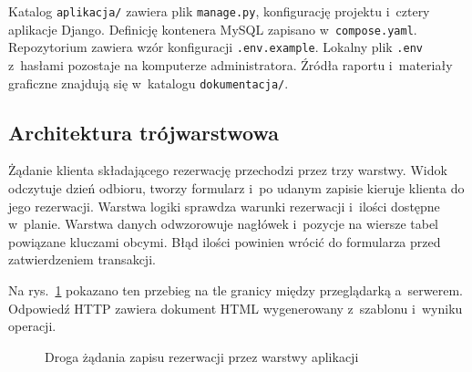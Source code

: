 \documentclass[12pt,a4paper,oneside]{article}
\newcounter{pu}
\begin{document}
Katalog \texttt{aplikacja/} zawiera plik \texttt{manage.py}, konfigurację projektu i~cztery aplikacje Django. Definicję kontenera MySQL zapisano w~\texttt{compose.yaml}. Repozytorium zawiera wzór konfiguracji \texttt{.env.example}. Lokalny plik \texttt{.env} z~hasłami pozostaje na komputerze administratora. Źródła raportu i~materiały graficzne znajdują się w~katalogu \texttt{dokumentacja/}.


\subsection{Architektura trójwarstwowa}
\label{sec:architektura}

Żądanie klienta składającego rezerwację przechodzi przez trzy warstwy. Widok odczytuje dzień odbioru, tworzy formularz i~po udanym zapisie kieruje klienta do jego rezerwacji. Warstwa logiki sprawdza warunki rezerwacji i~ilości dostępne w~planie. Warstwa danych odwzorowuje nagłówek i~pozycje na wiersze tabel powiązane kluczami obcymi. Błąd ilości powinien wrócić do formularza przed zatwierdzeniem transakcji.


Na rys.~\ref{rys:architektura} pokazano ten przebieg na tle granicy między przeglądarką a~serwerem. Odpowiedź HTTP zawiera dokument HTML wygenerowany z~szablonu i~wyniku operacji.
\begin{figure}[H]\centering
{}
\caption{Droga żądania zapisu rezerwacji przez warstwy aplikacji}\label{rys:architektura}
\end{figure}
\end{document}
